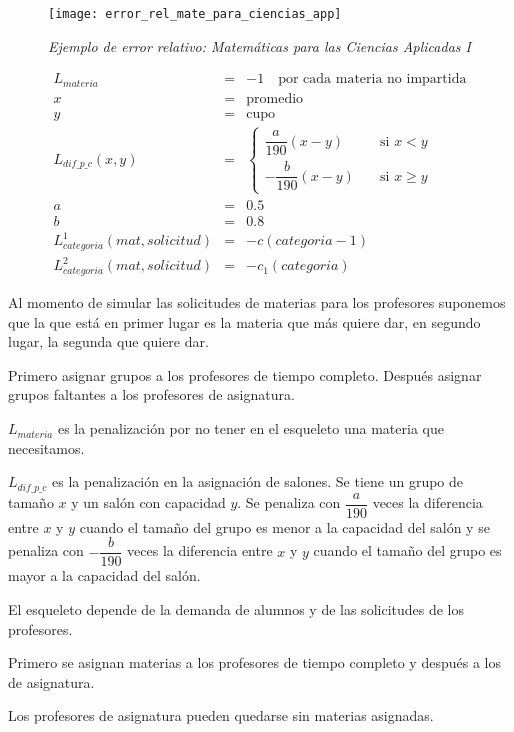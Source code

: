 \begin{figure}[H]
\centering
\texttt{[image: error\_rel\_mate\_para\_ciencias\_app]} %
\caption{\textit{Ejemplo de error relativo: Matemáticas para las Ciencias Aplicadas I}}\label{difRel_mate_ciencias_app}
\end{figure}


\begin{eqnarray*}
L_{materia} &=& -1 \,\,\,\,\,\,  \text{por cada materia no impartida}\\
x &=& \text{promedio}\\
y &=& \text{cupo}\\
L_{dif\_p\_c} (x,y) &=& \begin{cases}
    \dfrac{a}{190} (x-y)  & \quad \text{si } x<y\\
    - \dfrac{b}{190} (x-y)  & \quad \text{si } x\geqslant y
  \end{cases}\\
a &=& 0.5\\
b &=& 0.8\\
L_{categoria}^{1} (mat,solicitud) &=& -c(categoria - 1)\\
L_{categoria}^{2} (mat,solicitud) &=& -c_{1}(categoria)
\end{eqnarray*}

Al momento de simular las solicitudes de materias para los profesores suponemos que la que está en primer lugar es la materia que más quiere dar, en segundo lugar, la segunda que quiere dar.

Primero asignar grupos a los profesores de tiempo completo. Después asignar grupos faltantes a los profesores de asignatura.

$L_{materia}$ es la penalización por no tener en el esqueleto una materia que necesitamos.

$L_{dif\_p\_c}$ es la penalización en la asignación de salones. Se tiene un grupo de tamaño $x$ y un salón con capacidad $y$. Se penaliza con $\dfrac{a}{190}$ veces la diferencia entre $x$ y $y$ cuando el tamaño del grupo es menor a la capacidad del salón y se penaliza con $-\dfrac{b}{190}$ veces la diferencia entre $x$ y $y$ cuando el tamaño del grupo es mayor a la capacidad del salón.

El esqueleto depende de la demanda de alumnos y de las solicitudes de los profesores.

Primero se asignan materias a los profesores de tiempo completo y después a los de asignatura.

Los profesores de asignatura pueden quedarse sin materias asignadas.

